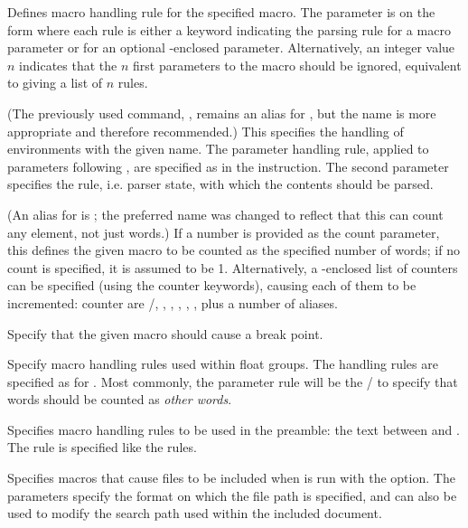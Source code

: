 
\begin{description}
\sloppy

Defines macro handling rule for the specified macro. The parameter is on the form  where each rule is either a keyword indicating the parsing rule for a macro parameter or  for an optional \code{[]}-enclosed parameter. Alternatively, an integer value $n$ indicates that the $n$ first parameters to the macro should be ignored, equivalent to giving a list of $n$  rules.

(The previously used command, , remains an alias for , but the name  is more appropriate and therefore recommended.)
This specifies the handling of environments with the given name. The parameter handling rule, applied to parameters following , are specified as in the  instruction. The second parameter specifies the rule, i.e. parser state, with which the contents should be parsed.

(An alias for  is ; the preferred name was changed to reflect that this can count any element, not just words.)
If a number is provided as the count parameter, this defines the given macro to be counted as the specified number of words; if no count is specified, it is assumed to be 1. Alternatively, a \code{[]}-enclosed list of counters can be specified (using the counter keywords), causing each of them to be incremented: counter are /, , , , , ,  plus a number of aliases.

Specify that the given macro should cause a break point.

Specify macro handling rules used within float groups. The handling rules are specified as for . Most commonly, the parameter rule will be the / to specify that words should be counted as \textit{other words}.

Specifies macro handling rules to be used in the preamble: the text between  and . The rule is specified like the  rules.

Specifies macros that cause files to be included when \TeXcount{} is run with the  option. The parameters specify the format on which the file path is specified, and can also be used to modify the search path used within the included document.

\end{description}
